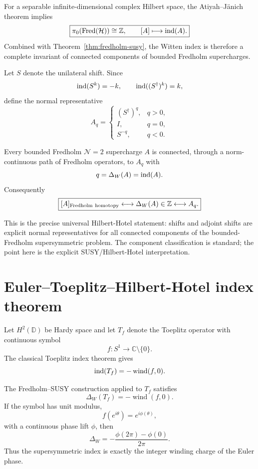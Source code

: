 For a separable infinite-dimensional complex Hilbert space, the Atiyah--J\"anich theorem implies
\[
\boxed{
\pi_0(\operatorname{Fred}(\mathcal H))\cong\mathbb Z,
\qquad
[A]\longmapsto\operatorname{ind}(A).
}
\]
Combined with Theorem~\ref{thm:fredholm-susy}, the Witten index is therefore a complete invariant of connected components of bounded Fredholm supercharges.

Let $S$ denote the unilateral shift. Since
\[
\operatorname{ind}(S^k)=-k,
\qquad
\operatorname{ind}((S^\dagger)^k)=k,
\]
define the normal representative
\[
A_q=
\begin{cases}
(S^\dagger)^q,&q>0,\\
I,&q=0,\\
S^{-q},&q<0.
\end{cases}
\]

\begin{theorem}\label{thm:hotel-normal-form}
Every bounded Fredholm $\mathcal N=2$ supercharge $A$ is connected, through a norm-continuous path of Fredholm operators, to $A_q$ with
\[
q=\Delta_W(A)=\operatorname{ind}(A).
\]
Consequently
\[
\boxed{
[A]_{\rm Fredholm\ homotopy}
\longleftrightarrow
\Delta_W(A)\in\mathbb Z
\longleftrightarrow
A_q.
}
\]
\end{theorem}

This is the precise universal Hilbert-Hotel statement: shifts and adjoint shifts are explicit normal representatives for all connected components of the bounded-Fredholm supersymmetric problem. The component classification is standard; the point here is the explicit SUSY/Hilbert-Hotel interpretation.

\section{Euler--Toeplitz--Hilbert-Hotel index theorem}

Let $H^2(\mathbb D)$ be Hardy space and let $T_f$ denote the Toeplitz operator with continuous symbol
\[
f:S^1\to\mathbb C\setminus\{0\}.
\]
The classical Toeplitz index theorem gives
\[
\operatorname{ind}(T_f)=-\operatorname{wind}(f,0).
\]

\begin{theorem}\label{thm:toeplitz-susy}
The Fredholm--SUSY construction applied to $T_f$ satisfies
\[
\boxed{
\Delta_W(T_f)
=
-\operatorname{wind}(f,0).
}
\]
If the symbol has unit modulus,
\[
f(e^{i\theta})=e^{i\phi(\theta)},
\]
with a continuous phase lift $\phi$, then
\[
\boxed{
\Delta_W
=
-\frac{\phi(2\pi)-\phi(0)}{2\pi}.
}
\]
Thus the supersymmetric index is exactly the integer winding charge of the Euler phase.
\end{theorem}

